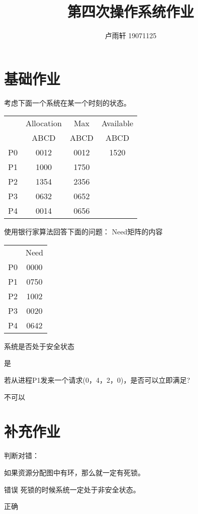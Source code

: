 \documentclass{ctexart}
\title{第四次操作系统作业}
\author{卢雨轩 19071125}
\begin{document}
\maketitle

\section*{基础作业}

\begin{outline}[enumerate]
    \1 考虑下面一个系统在某一个时刻的状态。
    \begin{center}
        \begin{tabular}{c c c c}
            & Allocation & Max & Available \\
            & ABCD & ABCD & ABCD \\
            P0 & 0012 & 0012 & 1520 \\
            P1 & 1000 & 1750 \\
            P2 & 1354 & 2356 \\
            P3 & 0632 & 0652 \\
            P4 & 0014 & 0656 \\
        \end{tabular}
    \end{center}
        使用银行家算法回答下面的问题：
        \2 Need矩阵的内容
            \begin{center}
                \begin{tabular}{c c}
                    & Need \\
                    P0 & 0000 \\
                    P1 & 0750 \\
                    P2 & 1002 \\
                    P3 & 0020 \\
                    P4 & 0642 \\
                \end{tabular}
            \end{center}
        \2 系统是否处于安全状态
            
            是
        
        \2 若从进程P1发来一个请求(0，4，2，0)，是否可以立即满足?

            不可以


\end{outline}

\section*{补充作业}
判断对错：
\begin{outline}
    \1 如果资源分配图中有环，那么就一定有死锁。 

        错误
    \1 死锁的时候系统一定处于非安全状态。
    
        正确
\end{outline}
\end{document}
